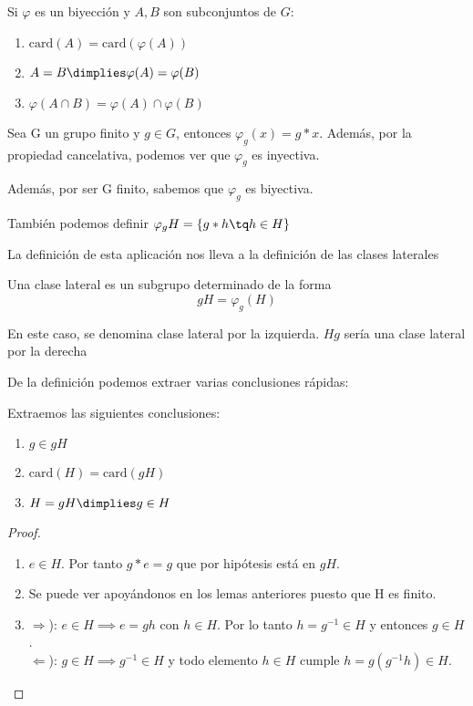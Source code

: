 \documentclass[nochap]{apuntes}
\begin{document}
  \begin{lemma}
   Si $\varphi$  es un biyección y $A, B$ son subconjuntos de $G$:
   \begin{enumerate}
    \item $\text{card}(A)=\text{card}(\varphi(A))$
    \item $A=B \dimplies \varphi(A)=\varphi(B)$
    \item $\varphi(A\cap B)=\varphi(A)\cap\varphi(B)$
   \end{enumerate}
  \end{lemma}

  \begin{lemma}
   Sea G un grupo finito y $g \in G$, entonces $\varphi_{g}(x)=g\ast x$. Además, por la propiedad cancelativa, podemos ver que $\varphi_{g}$ es inyectiva.

   Además, por ser G finito, sabemos que $\varphi_{g}$ es biyectiva.
  \end{lemma}
  También podemos definir $\varphi_{g} H=\{g\ast h\tq h\in H\}$

  La definición de esta aplicación nos lleva a la definición de las clases laterales

  \begin{defn} Una clase lateral es un subgrupo determinado de la forma
  \[  gH=\varphi_{g}(H) \]

  En este caso, se denomina clase lateral por la izquierda. $Hg$ sería una clase lateral por la derecha
  \end{defn}

  De la definición podemos extraer varias conclusiones rápidas:

  \begin{corol}
  \label{corol1}
  Extraemos las siguientes conclusiones:
   \begin{enumerate}
    \item $g \in gH$
    \item $\text{card}(H)=\text{card}(gH)$
    \item $H=gH \dimplies g \in H$
   \end{enumerate}
  \end{corol}

  \begin{proof}
   \begin{enumerate}
    \item $e \in  H$. Por tanto $g\ast e =g$ que por hipótesis está en $gH$.
    \item Se puede ver apoyándonos en los lemas anteriores puesto que H es finito.
    \item $\Rightarrow$):  $e \in H \implies e=gh$ con $h \in H$. Por lo tanto $h=g^{-1} \in H$ y entonces $g \in H$.\\
	  $\Leftarrow$):  $g \in H \implies g^{-1}\in H$ y todo elemento $h \in H$ cumple $h=g(g^{-1}h)\in H$.
   \end{enumerate}
  \end{proof}
\end{document}
